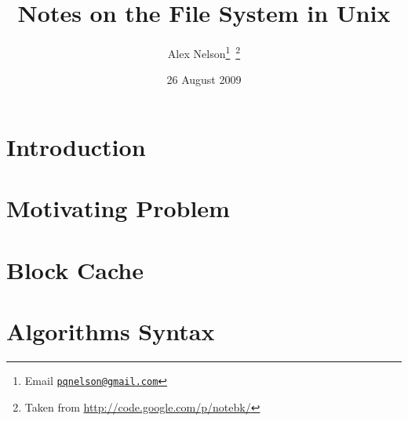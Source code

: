 \documentclass{article}
\title{Notes on the File System in Unix}
\author{Alex Nelson\footnote{Email \href{mailto:pqnelson@gmail.com}{\tt pqnelson@gmail.com}}~\footnote{Taken from \url{http://code.google.com/p/notebk/}}}
\date{26 August 2009}
\numberwithin{algorithm}{section}
\begin{document}
\maketitle
\tableofcontents
\listofalgorithms
\pagebreak
\section{Introduction}


\section{Motivating Problem}


\section{Block Cache}


%
\appendix
\section{Algorithms Syntax}


\nocite{*}
\footnotesize{


}
\end{document}
